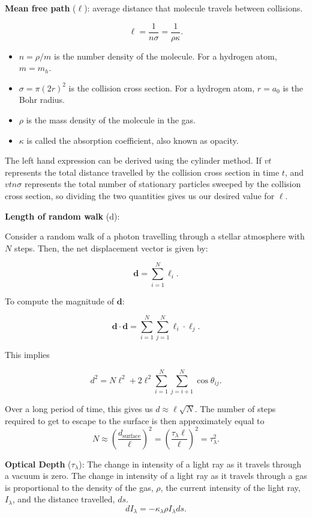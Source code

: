 \documentclass[12pt]{article}
\newcommand{\V}{

\vspace{\baselineskip}

}
\begin{document}
\textbf{Mean free path} ($\ell$): average distance that molecule travels between collisions. 

\[\ell = \frac{1}{n\sigma} = \frac{1}{\rho \kappa}.\]

\begin{itemize}
    \item $n = \rho / m$ is the number density of the molecule. For a hydrogen atom, $m = m_h$. 
    \item $\sigma = \pi(2r)^2$ is the collision cross section. For a hydrogen atom, $r = a_0$ is the Bohr radius. 
    \item $\rho$ is the mass density of the molecule in the gas.
    \item $\kappa$ is called the absorption coefficient, also known as opacity. 
\end{itemize}

The left hand expression can be derived using the cylinder method. If $vt$ represents the total distance travelled by the collision cross section in time $t$, and $vtn\sigma$ represents the total number of stationary particles sweeped by the collision cross section, so dividing the two quantities gives us our desired value for $\ell$.\V

\textbf{Length of random walk} (d): 

Consider a random walk of a photon travelling through a stellar atmosphere with $N$ steps. Then, the net displacement vector is given by: 

\[\mathbf{d} = \sum_{i=1}^N \bm{\ell}_i.\]

To compute the magnitude of $\mathbf{d}$:

\[\mathbf{d}\cdot \mathbf{d} = \sum_{i=1}^{N}\sum_{j=1}^N \bm{\ell}_i\cdot \bm{\ell}_j.\]

This implies

\[d^2 = N\ell^2 + 2\ell^2\sum_{i=1}^{N}\sum_{j=i+1}^{N}\cos{\theta_{ij}}.\]

Over a long period of time, this gives us $d\approx \ell \sqrt{N}$. The number of steps required to get to escape to the surface is then approximately equal to \[N \approx \left(\frac{d_{\text{surface}}}{\ell}\right)^2 = \left(\frac{\tau_{\lambda} \ell}{\ell}\right)^2 = \tau_{\lambda}^2. \]

\V

\textbf{Optical Depth} ($\tau_{\lambda}$): 
The change in intensity of a light ray as it travels through a vacuum is zero. The change in intensity of a light ray as it travels through a gas is proportional to the density of the gas, $\rho$, the current intensity of the light ray, $I_{\lambda}$, and the distance travelled, $ds$.
\[dI_{\lambda} = -\kappa_{\lambda}\rho I_{\lambda}ds.\]
\end{document}
